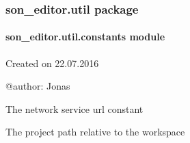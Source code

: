 \documentclass[letterpaper,10pt,english]{sphinxmanual}
\begin{document}
\subsubsection{son\_editor.util package}
\label{_source/son_editor.util:son-editor-util-package}\label{_source/son_editor.util::doc}

\paragraph{son\_editor.util.constants module}
\label{_source/son_editor.util:module-son_editor.util.constants}\label{_source/son_editor.util:son-editor-util-constants-module}
Created on 22.07.2016

@author: Jonas

\begin{fulllineitems}
\label{_source/son_editor.util:son_editor.util.constants.CATALOGUES}
The network service url constant

\end{fulllineitems}


\begin{fulllineitems}
\label{_source/son_editor.util:son_editor.util.constants.GIT}
The project path relative to the workspace

\end{fulllineitems}

\end{document}
